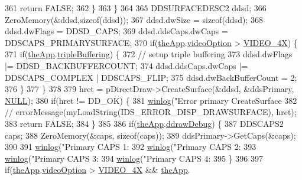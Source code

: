 \begin{DoxyCode}
{{{{{{361       \textcolor{keywordflow}{return} FALSE;
362     \}
363   \}
364   
365   DDSURFACEDESC2 ddsd;
366   ZeroMemory(&ddsd,\textcolor{keyword}{sizeof}(ddsd));
367   ddsd.dwSize = \textcolor{keyword}{sizeof}(ddsd);
368   ddsd.dwFlags = DDSD\_CAPS;
369   ddsd.ddsCaps.dwCaps = DDSCAPS\_PRIMARYSURFACE;
370   \textcolor{keywordflow}{if}(\mbox{\hyperlink{_v_b_a_8cpp_a8095a9d06b37a7efe3723f3218ad8fb3}{theApp}}.\mbox{\hyperlink{class_v_b_a_a17dac073149c897f770c00ed7098ad32}{videoOption}} > \mbox{\hyperlink{_v_b_a_8h_a531c35e38ede3ea4e5ba5afb24b29493a6468bce6b84e6350d3de126f257eb38d}{VIDEO\_4X}}) \{
371     \textcolor{keywordflow}{if}(\mbox{\hyperlink{_v_b_a_8cpp_a8095a9d06b37a7efe3723f3218ad8fb3}{theApp}}.\mbox{\hyperlink{class_v_b_a_af597e2c2466efdc6365a5d725651b855}{tripleBuffering}}) \{
372       \textcolor{comment}{// setup triple buffering}
373       ddsd.dwFlags |= DDSD\_BACKBUFFERCOUNT;
374       ddsd.ddsCaps.dwCaps |= DDSCAPS\_COMPLEX | DDSCAPS\_FLIP;
375       ddsd.dwBackBufferCount = 2;
376     \}
377   \}
378   
379   hret = pDirectDraw->CreateSurface(&ddsd, &ddsPrimary, \mbox{\hyperlink{getopt1_8c_a070d2ce7b6bb7e5c05602aa8c308d0c4}{NULL}});
380   \textcolor{keywordflow}{if}(hret != DD\_OK) \{
381     \mbox{\hyperlink{_direct_draw_8cpp_aceca31284db939464c9dc0fb15c92786}{winlog}}(\textcolor{stringliteral}{"Error primary CreateSurface %
382     \textcolor{comment}{//    errorMessage(myLoadString(IDS\_ERROR\_DISP\_DRAWSURFACE), hret);}
383     \textcolor{keywordflow}{return} FALSE;
384   \}
385 
386   \textcolor{keywordflow}{if}(\mbox{\hyperlink{_v_b_a_8cpp_a8095a9d06b37a7efe3723f3218ad8fb3}{theApp}}.\mbox{\hyperlink{class_v_b_a_a28d611a2c3dfc21191a27e8d8239de35}{ddrawDebug}}) \{
387     DDSCAPS2 caps;
388     ZeroMemory(&caps, \textcolor{keyword}{sizeof}(caps));
389     ddsPrimary->GetCaps(&caps);
390 
391     \mbox{\hyperlink{_direct_draw_8cpp_aceca31284db939464c9dc0fb15c92786}{winlog}}(\textcolor{stringliteral}{"Primary CAPS 1: %
392     \mbox{\hyperlink{_direct_draw_8cpp_aceca31284db939464c9dc0fb15c92786}{winlog}}(\textcolor{stringliteral}{"Primary CAPS 2: %
393     \mbox{\hyperlink{_direct_draw_8cpp_aceca31284db939464c9dc0fb15c92786}{winlog}}(\textcolor{stringliteral}{"Primary CAPS 3: %
394     \mbox{\hyperlink{_direct_draw_8cpp_aceca31284db939464c9dc0fb15c92786}{winlog}}(\textcolor{stringliteral}{"Primary CAPS 4: %
395   \}
396 
397   \textcolor{keywordflow}{if}(\mbox{\hyperlink{_v_b_a_8cpp_a8095a9d06b37a7efe3723f3218ad8fb3}{theApp}}.\mbox{\hyperlink{class_v_b_a_a17dac073149c897f770c00ed7098ad32}{videoOption}} > \mbox{\hyperlink{_v_b_a_8h_a531c35e38ede3ea4e5ba5afb24b29493a6468bce6b84e6350d3de126f257eb38d}{VIDEO\_4X}} && \mbox{\hyperlink{_v_b_a_8cpp_a8095a9d06b37a7efe3723f3218ad8fb3}{theApp}}.
}}}}}}}}}}}
\end{DoxyCode}
